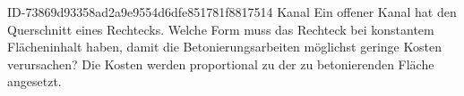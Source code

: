 \begin{exercise}
      {ID-73869d93358ad2a9e9554d6dfe851781f8817514}
      {Kanal}
  \ifproblem\problem
    Ein offener Kanal hat den Querschnitt eines Rechtecks. Welche Form muss das
    Rechteck bei konstantem Flächeninhalt haben, damit die Betonierungsarbeiten
    möglichst geringe Kosten verursachen? Die Kosten werden proportional zu der
    zu betonierenden Fläche angesetzt.
  \fi
\end{exercise}
